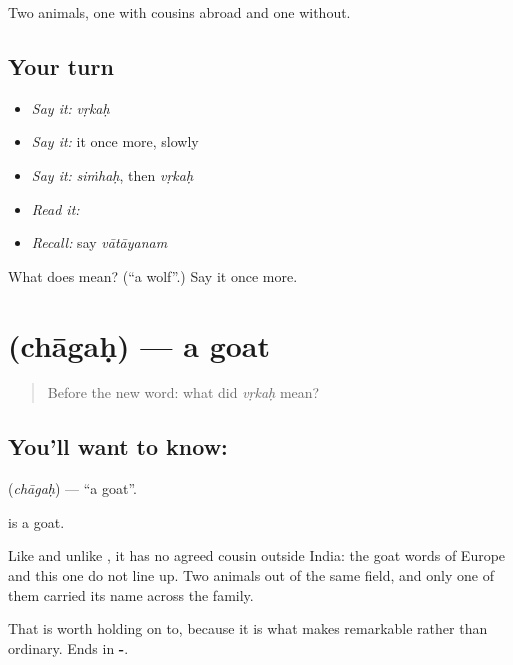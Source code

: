 \begin{grammarlens}[title={What you've built}]
Two animals, one with cousins abroad and one without.
\end{grammarlens}

\subsection*{Your turn}
\begin{itemize}
\raggedright
  \item \emph{Say it:} \emph{vṛkaḥ}
  \item \emph{Say it:} it once more, slowly
  \item \emph{Say it:} \emph{siṁhaḥ}, then \emph{vṛkaḥ}
  \item \emph{Read it:} \textbf{}
  \item \emph{Recall:} say \emph{vātāyanam}
\end{itemize}

\begin{tcolorbox}[breakable,colback=teal!4,colframe=teal!35!black,title={Before you move on}]
What does  mean? (\textquotedblleft{}a wolf\textquotedblright{}.) Say it once more.
\end{tcolorbox}
\section[\texorpdfstring{\sk{छागः} (chāgaḥ)}{छागः (chāgaḥ)}]{ (chāgaḥ) — a goat}

\label{lesson:SA-C48-goat}



\begin{quote}
Before the new word: what did \emph{vṛkaḥ} mean?
\end{quote}

\subsection*{You'll want to know: }
\textbf{} (\emph{chāgaḥ}) — \textquotedblleft{}a goat\textquotedblright{}.

\textbf{} is a goat.

Like  and unlike , it has no agreed cousin outside India: the goat words of Europe and this one do not line up. Two animals out of the same field, and only one of them carried its name across the family.

That is worth holding on to, because it is what makes  remarkable rather than ordinary. Ends in \textbf{-}.

